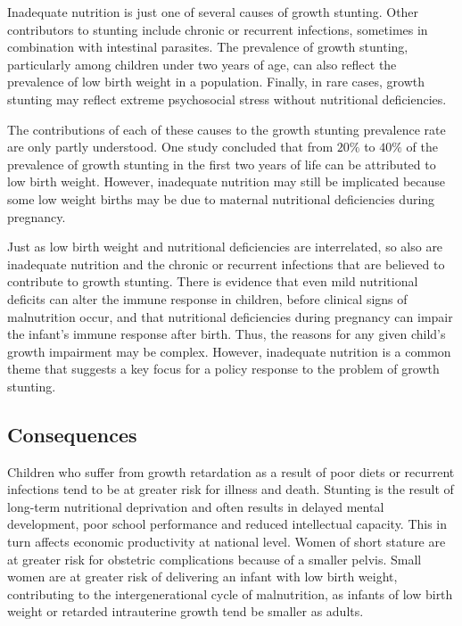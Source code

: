 \documentclass[10pt,twocolumn,letterpaper]{article}
\begin{document}
Inadequate nutrition is just one of several causes of growth stunting. Other contributors to stunting include chronic or recurrent infections, sometimes in combination with intestinal parasites. The prevalence of growth stunting, particularly among children under two years of age, can also reflect the prevalence of low birth weight in a population. Finally, in rare cases, growth stunting may reflect extreme psychosocial stress without nutritional deficiencies.

The contributions of each of these causes to the growth stunting prevalence rate are only partly understood. One study concluded that from $20\%$ to $40\%$ of the prevalence of growth stunting in the first two years of life can be attributed to low birth weight. However, inadequate nutrition may still be implicated because some low weight births may be due to maternal nutritional deficiencies during pregnancy.

Just as low birth weight and nutritional deficiencies are interrelated, so also are inadequate nutrition and the chronic or recurrent infections that are believed to contribute to growth stunting. There is evidence that even mild nutritional deficits can alter the immune response in children, before clinical signs of malnutrition occur, and that nutritional deficiencies during pregnancy can impair the infant's immune response after birth. Thus, the reasons for any given child's growth impairment may be complex. However, inadequate nutrition is a common theme that suggests a key focus for a policy response to the problem of growth stunting.



\subsection{Consequences}

Children who suffer from growth retardation as a result of poor diets or recurrent infections tend to be at greater risk for illness and death. Stunting is the result of long-term nutritional deprivation and often results in delayed mental development, poor school performance and reduced intellectual capacity. This in turn affects economic productivity at national level. Women of short stature are at greater risk for obstetric complications because of a smaller pelvis. Small women are at greater risk of delivering an infant with low birth weight, contributing to the intergenerational cycle of malnutrition, as infants of low birth weight or retarded intrauterine growth tend be smaller as adults.
\end{document}
